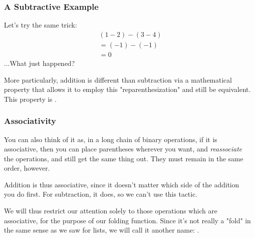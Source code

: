 \documentclass[aspectratio=169]{beamer}
\begin{document}
\begin{frame}[fragile]
  \frametitle{A Subtractive Example}

  Let's try the same trick:
  \pause
  \begin{align*}
    & (1 - 2) - (3 - 4) \\
    &= (-1) - (-1) \\
    &= 0
  \end{align*}
  \pause
  ...What just happened?

  \pause
  \vspace{\fill}


  \pause
  \vspace{\fill}

  More particularly, addition is different than subtraction via a mathematical
  property that allows it to employ this "reparenthesization" and still be
  equivalent. This property is .
\end{frame}

\begin{frame}[fragile]
  \frametitle{Associativity}


  \pause
  \vspace{\fill}

  You can also think of it as, in a long chain of binary operations, if it
  is associative, then you can place parentheses wherever you want, and
  \textit{reassociate} the operations, and still get the same thing out.
  They must remain in the same order, however.

  \pause
  \vspace{\fill}

  Addition is thus associative, since it doesn't matter which side of the
  addition you do first. For subtraction, it does, so we can't use this
  tactic.

  \pause
  \vspace{\fill}

  We will thus restrict our attention solely to those operations which
  are associative, for the purpose of our folding function. Since it's
  not really a "fold" in the same sense as we saw for lists, we will call
  it another name: .
\end{frame}
\end{document}
